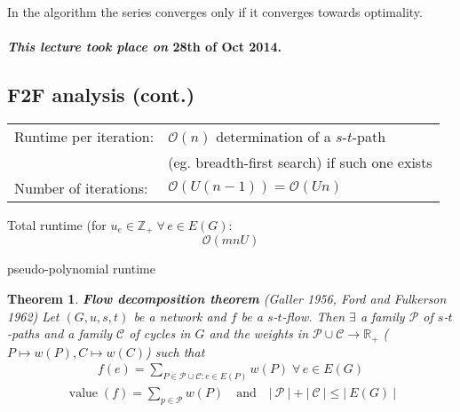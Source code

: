 \documentclass{article}
\newtheorem{theorem}{Theorem}
\newcommand{\card}[1]{\left|\:\!#1\:\!\right|}
\newcommand{\dateref}[1]{\paragraph{\textit{This lecture took place on} #1.}}
\newcommand{\gath}[2]{$#1$-$#2$-path} %
\newcommand{\flow}[2]{$#1$-$#2$-flow}
\newcommand{\fall}{\;\forall\,}
\begin{document}
In the algorithm the series converges only if it converges towards optimality.

\dateref{28th of Oct 2014}

\subsection{F2F analysis (cont.)}
%
\begin{center}
  \begin{tabular}{ll}
    Runtime per iteration:  & $\mathcal{O}(n)$ determination of a \gath st \\
                            & (eg. breadth-first search) if such one exists \\
    Number of iterations:   & $\mathcal{O}(U(n-1)) = \mathcal{O}(Un)$
  \end{tabular}
\end{center}

Total runtime (for $u_e \in \mathbb{Z}_+ \fall e \in E(G):$
\[
  \mathcal{O}(mnU)
\]
\begin{center}
  pseudo-polynomial runtime
\end{center}

\begin{theorem}\label{satz-4.5}
  \textbf{Flow decomposition theorem} (Galler 1956, Ford and Fulkerson 1962)
  Let $(G, u, s, t)$ be a network and $f$ be a \flow st. Then $\exists$ a family
  $\mathcal{P}$ of \gath sts and a family $\mathcal{C}$ of cycles in $G$ and the
  weights in $\mathcal{P} \cup \mathcal{C} \rightarrow \mathbb{R}_+$
  ($P \mapsto w(P), C \mapsto w(C)$) such that
  \begin{align*}
    f(e) = \sum_{P \in \mathcal{P} \cup \mathcal{C}: e \in E(P)} w(P) \fall e \in E(G)
  \end{align*}
  \begin{align*}
    \operatorname{value}(f) = \sum_{p \in \mathcal{P}} w(P)
      \quad\text{and}\quad
      \card{\mathcal{P}} + \card{\mathcal{C}} \leq \card{E(G)}
  \end{align*}
\end{theorem}
\end{document}
